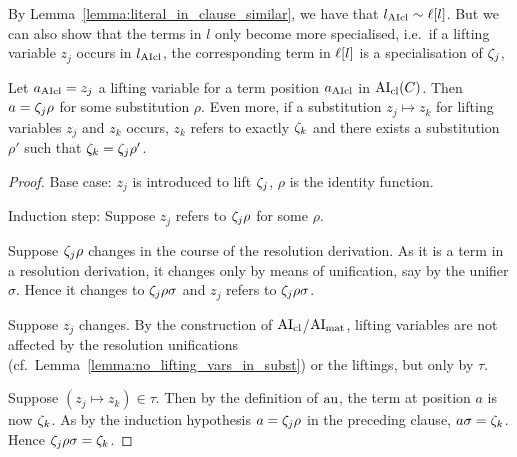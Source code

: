 \documentclass[,%
	paper=a4,%
	DIV14, %
	twoside=false,%
	liststotoc,
	bibtotoc,
	draft=false,%
	numbers=noendperiod
]{scrartcl}
\begin{document}
By Lemma~\ref{lemma:literal_in_clause_similar}, we have that $l_{\operatorname{AIcl}} \sim \ell[l]$.
But we can also show that the terms in $l$ only become more specialised, i.e.\ if a lifting variable $z_j$ occurs in $l_{\operatorname{AIcl}}$, the corresponding term in $\ell[l]$ is a specialisation of $\zeta_{j}$, 
\begin{lemma}
	\label{lemma:lifting_var_refers_to_abstraction_of_term}
	Let $a_{\operatorname{AIcl}} = z_j$ a lifting variable for a term position $a_{\operatorname{AIcl}}$ in $\operatorname{AI}_\mathrm{cl}(C)$. Then $a = \zeta_{j}\rho$ for some substitution $\rho$.
	Even more, if a substitution $z_j\mapsto z_k$ for lifting variables $z_j$ and $z_k$ occurs,
	$z_k$ refers to exactly $\zeta_{k}$ and there exists a substitution $\rho'$ such that $\zeta_{k} = \zeta_{j}\rho'$.
\end{lemma}
\begin{proof}
	Base case:
	$z_j$ is introduced to lift $\zeta_{j}$, $\rho$ is the identity function.

	Induction step:
	Suppose $z_j$ refers to $\zeta_{j}\rho$ for some $\rho$.

	Suppose $\zeta_{j}\rho$ changes in the course of the resolution derivation.
	As it is a term in a resolution derivation, it changes only by means of unification, say by the unifier $\sigma$.
	Hence it changes to $\zeta_{j}\rho\sigma$ and $z_j$ refers to $\zeta_{j}\rho\sigma$.

	Suppose $z_j$ changes. By the construction of $\operatorname{AI}_\mathrm{cl}$/$\operatorname{AI}_\mathrm{mat}$, lifting variables are not affected by the resolution unifications (cf.\ Lemma~\ref{lemma:no_lifting_vars_in_subst}) or the liftings, but only by $\tau$.

	Suppose $(z_j\mapsto z_k)\in \tau$.
	Then by the definition of $\operatorname{au}$, the term at position $a$ is now $\zeta_{k}$. 
	As by the induction hypothesis $a = \zeta_{j}\rho$ in the preceding clause, $a\sigma = \zeta_{k}$.
	Hence $\zeta_{j}\rho\sigma = \zeta_{k}$.
\end{proof}
\end{document}
